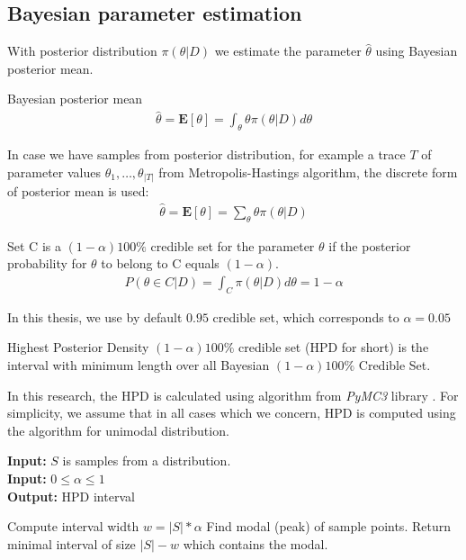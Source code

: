\subsection{Bayesian parameter estimation}
With posterior distribution $\pi(\theta|D)$ we estimate the parameter $\hat{\theta}$ using Bayesian
posterior mean.
\begin{definition}{Bayesian posterior mean}
    \begin{align*}
        \hat{\theta} = \mathbf{E}[\theta] = \int_\theta \theta \pi(\theta|D) d\theta
    \end{align*}
\end{definition}
In case we have samples from posterior distribution, for example a trace $T$ of parameter values
${\theta_1,\dots,\theta_|T|}$ from Metropolis-Hastings algorithm, the discrete form of posterior
mean is used:
\begin{align*}
    \hat{\theta} = \mathbf{E}[\theta] = \sum_\theta \theta \pi(\theta|D)
\end{align*}

\begin{definition}
    Set C is a $(1 − \alpha )100\%$ credible set for the parameter $\theta$ if the posterior
    probability for $\theta$ to belong to C equals $(1 − \alpha)$.
    \begin{align*}
        P(\theta \in C | D) = \int_C \pi(\theta|D) d\theta = 1 - \alpha
    \end{align*}
\end{definition}
In this thesis, we use by default $0.95$ credible set, which corresponds to $\alpha=0.05$
\begin{definition}
    Highest Posterior Density $(1-\alpha)100\%$ credible set (HPD for short) is the
    interval with minimum length over all Bayesian $(1-\alpha)100\%$ Credible Set.
\end{definition}

In this research, the HPD is calculated using algorithm from \textit{PyMC3} library
\cite{salvatier2016pymc3}. For simplicity, we assume that in all cases which we concern, HPD is
computed using the algorithm for unimodal distribution.
\begin{algorithm}[H]
    \caption{Compute Highest Posterior Density Interval}
    \label{mh}
    \hspace*{\algorithmicindent} \textbf{Input:} $S$ is samples from a distribution. \\
    \hspace*{\algorithmicindent} \textbf{Input:} $0\leq \alpha \leq 1$ \\
    \hspace*{\algorithmicindent} \textbf{Output:} HPD interval
    \begin{algorithmic}[1]
        \State Compute interval width $w = |S| * \alpha$
        \State Find modal (peak) of sample points.
        \State Return minimal interval of size $|S| - w$ which contains the modal.
        \EndProcedure
    \end{algorithmic}
\end{algorithm}

